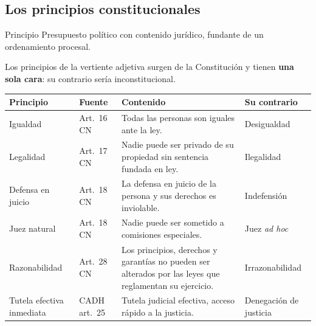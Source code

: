 \documentclass[12pt,oneside]{book}
\renewcommand{\arraystretch}{1.15}
\begin{document}
\subsection{Los principios constitucionales}

\begin{definicion}{Principio}
Presupuesto político con contenido jurídico, fundante de un ordenamiento procesal.
\end{definicion}

Los principios de la vertiente adjetiva surgen de la Constitución y tienen \textbf{una sola cara}: su contrario sería inconstitucional.

\begin{table}[H]
\centering
\renewcommand{\arraystretch}{1.2}
\small
\begin{tabularx}{\textwidth}{>{\RaggedRight\arraybackslash}p{2.5cm}>{\RaggedRight\arraybackslash}p{2.0cm}>{\RaggedRight\arraybackslash}X>{\RaggedRight\arraybackslash}p{3.2cm}}
\toprule
\textbf{Principio} & \textbf{Fuente} & \textbf{Contenido} & \textbf{Su contrario} \\
\midrule
Igualdad & Art.~16 CN & Todas las personas son iguales ante la ley. & Desigualdad \\
Legalidad & Art.~17 CN & Nadie puede ser privado de su propiedad sin sentencia fundada en ley. & Ilegalidad \\
Defensa en juicio & Art.~18 CN & La defensa en juicio de la persona y sus derechos es inviolable. & Indefensión \\
Juez natural & Art.~18 CN & Nadie puede ser sometido a comisiones especiales. & Juez \textit{ad hoc} \\
Razonabilidad & Art.~28 CN & Los principios, derechos y garantías no pueden ser alterados por las leyes que reglamentan su ejercicio. & Irrazonabilidad \\
Tutela efectiva inmediata & CADH art.~25 & Tutela judicial efectiva, acceso rápido a la justicia. & Denegación de justicia \\
\bottomrule
\end{tabularx}
\end{table}
\end{document}
